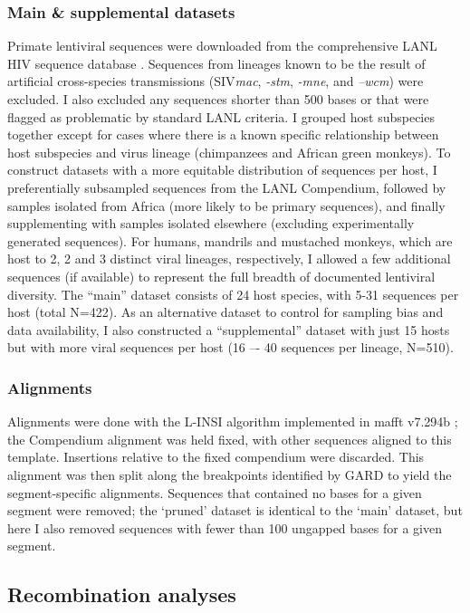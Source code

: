 \subsubsection*{Main \& supplemental datasets}
Primate lentiviral sequences were downloaded from the comprehensive LANL HIV sequence database \citep{los2012hiv}.
Sequences from lineages known to be the result of artificial cross-species transmissions (SIV\textit{mac}, \textit{-stm}, \textit{-mne}, and \textit{–wcm}) were excluded.
I also excluded any sequences shorter than 500 bases or that were flagged as problematic by standard LANL criteria.
I grouped host subspecies together except for cases where there is a known specific relationship between host subspecies and virus lineage (chimpanzees and African green monkeys).
To construct datasets with a more equitable distribution of sequences per host, I preferentially subsampled sequences from the LANL Compendium, followed by samples isolated from Africa (more likely to be primary sequences), and finally supplementing with samples isolated elsewhere (excluding experimentally generated sequences).
For humans, mandrils and mustached monkeys, which are host to 2, 2 and 3 distinct viral lineages, respectively, I allowed a few additional sequences (if available) to represent the full breadth of documented lentiviral diversity.
The “main” dataset consists of 24 host species, with 5-31 sequences per host (total N=422).
As an alternative dataset to control for sampling bias and data availability, I also constructed a “supplemental” dataset with just 15 hosts but with more viral sequences per host (16 –- 40 sequences per lineage, N=510).

\subsubsection*{Alignments}
Alignments were done with the L-INSI algorithm implemented in mafft v7.294b \citep{katoh2013mafft}; the Compendium alignment was held fixed, with other sequences aligned to this template.
Insertions relative to the fixed compendium were discarded.
This alignment was then split along the breakpoints identified by GARD to yield the segment-specific alignments.
Sequences that contained no bases for a given segment were removed; the `pruned' dataset is identical to the `main' dataset, but here I also removed sequences with fewer than 100 ungapped bases for a given segment.

\subsection*{Recombination analyses}
